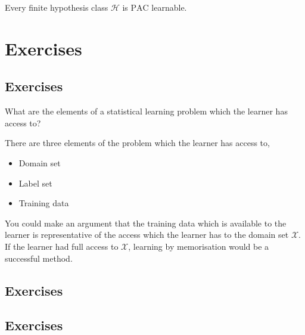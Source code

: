 \begin{proposition}
	Every finite hypothesis class $ \mathcal{H} $ is $ \mathrm{PAC} $ learnable.
\end{proposition}

\section{Exercises}
\subsection{Exercises \basic}
\begin{exercise}
	\begin{problem}
	What are the elements of a statistical learning problem which the learner has access to?
	\end{problem}
	\begin{solution}
		There are three elements of the problem which the learner has access to,
		\begin{itemize}
			\item Domain set
			\item Label set
			\item Training data
		\end{itemize}

		You could make an argument that the training data which is available to the learner is representative of the access which the learner has to the domain set $ \mathcal{X} $. If the learner had full access to $ \mathcal{X} $, learning by memorisation would be a successful method.
	\end{solution}
\end{exercise}

\subsection{Exercises \intermediate}
\subsection{Exercises \challenging}

